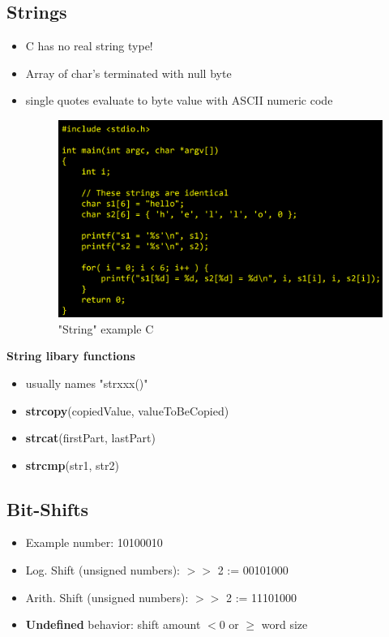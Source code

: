 \documentclass[a4paper,10pt]{article}
\begin{document}
\subsection{Strings}
\begin{itemize}
    \item C has no real string type!
    \item Array of char's terminated with null byte
    \item single quotes evaluate to byte value with ASCII numeric code
    \begin{figure}[h!]
        \centering
        \includegraphics[width=0.75\linewidth]{Pictures/e16.png}
        \caption{"String" example C}
        \label{fig:enter-label}
    \end{figure}
\end{itemize}
\textbf{String libary functions}
\begin{itemize}
    \item usually names "strxxx()"
    \item \textbf{strcopy}(copiedValue, valueToBeCopied)
    \item \textbf{strcat}(firstPart, lastPart)
    \item \textbf{strcmp}(str1, str2)
\end{itemize}
\subsection{Bit-Shifts}
\begin{itemize}
    \item Example number: 10100010
    \item Log. Shift (unsigned numbers): $>>$ 2 := 00101000
    \item Arith. Shift (unsigned numbers): $>>$ 2 := 11101000
    \item \textbf{Undefined} behavior: shift amount $<0$ or $\ge$ word size
\end{itemize}
\end{document}
